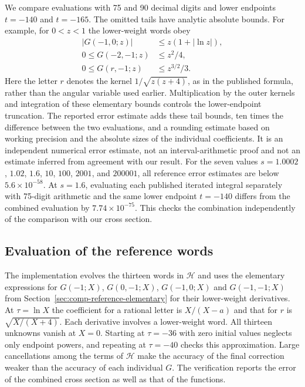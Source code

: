 We compare evaluations with 75 and 90 decimal digits and lower endpoints
$t=-140$ and $t=-165$.  The omitted tails have analytic absolute bounds.
For example, for $0<z<1$ the lower-weight words obey
\begin{align}
 |G(-1,0;z)|&\leq z(1+|\ln z|),\\
 0\leq G(-2,-1;z)&\leq z^2/4,\\
 0\leq G(r,-1;z)&\leq z^{3/2}/3.
\end{align}
Here the letter $r$ denotes the kernel $1/\sqrt{z(z+4)}$, as in the
published formula, rather than the angular variable used earlier.
Multiplication by the outer kernels and integration of these elementary
bounds controls the lower-endpoint truncation.  The reported error
estimate adds these tail bounds, ten times the difference between the two
evaluations, and a rounding estimate based on working precision and the
absolute sizes of the individual coefficients.  It is an independent
numerical error estimate, not an interval-arithmetic proof and not an
estimate inferred from agreement with our result.
For the seven values $s=1.0002$, $1.02$, $1.6$, $10$, $100$, $2001$, and
$200001$, all reference error estimates are below $5.6\times10^{-58}$.
At $s=1.6$, evaluating each published iterated integral separately with
75-digit arithmetic and the same lower endpoint $t=-140$ differs from
the combined evaluation by $7.74\times10^{-75}$.  This checks the
combination independently of the comparison with our cross section.

\subsection{Evaluation of the reference words}
The implementation evolves the thirteen words in $\mathcal H$ and uses
the elementary expressions for $G(-1;X)$, $G(0,-1;X)$, $G(-1,0;X)$ and
$G(-1,-1;X)$ from Section~\ref{sec:comp-reference-elementary} for their
lower-weight derivatives. At
$\tau=\ln X$ the coefficient for a rational letter is
$X/(X-a)$ and that for $r$ is $\sqrt{X/(X+4)}$.
Each derivative involves a lower-weight word. All thirteen unknowns
vanish at $X=0$. Starting at $\tau=-36$ with zero initial values
neglects only endpoint powers, and repeating at $\tau=-40$ checks
this approximation. Large cancellations among the terms of $\mathcal H$
make the accuracy of the final correction weaker than the accuracy
of each individual $G$. The verification reports the error of the
combined cross section as well as that of the functions.


